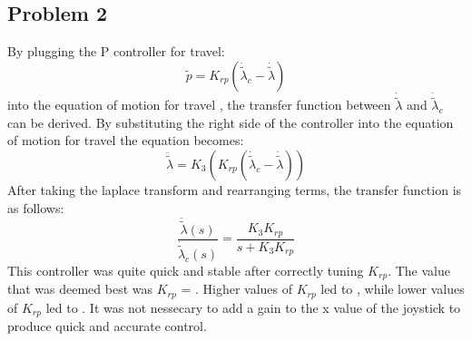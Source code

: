 \subsection{Problem 2}
By plugging the P controller for travel: 
\begin{equation}
	\tilde{p} = K_{rp}(\dot{\tilde{\lambda}}_c - \dot{\tilde{\lambda}})
\end{equation}
into the equation of motion for travel , the transfer function between $\dot{\tilde{\lambda}}$ and $\dot{\tilde{\lambda}}_c$  can be derived. By substituting the right side of the controller into the equation of motion for travel the equation becomes:
\begin{equation}
	\ddot{\tilde{\lambda}} = K_3(K_{rp}(\dot{\tilde{\lambda}}_c - \dot{\tilde{\lambda}}))
\end{equation}
After taking the laplace transform and rearranging terms, the transfer function is as follows:
\begin{equation}
	\frac{\ddot{\tilde{\lambda}}(s)}{\dot{\tilde{\lambda}}_c(s)} = \frac{K_3K_{rp}}{s + K_3K_{rp}}
\end{equation}
This controller was quite quick and stable after correctly tuning $K_{rp}$. The value that was deemed best was $K_{rp}$ = . Higher values of $K_{rp}$ led to , while lower values of $K_{rp}$ led to .  It was not nessecary to add a gain to the x value of the joystick to produce quick and accurate control.



